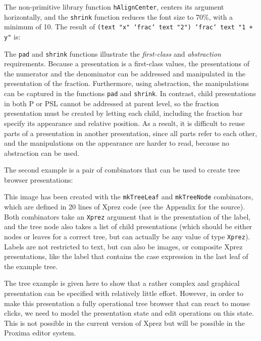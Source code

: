 \noindent The non-primitive library function \texttt{hAlignCenter}, centers its argument horizontally, and the \texttt{shrink} function reduces the font size to 70\%, with a minimum of 10. The result of \texttt{(text "x" `frac` text "2") `frac` text "1 + y"} is:

\begin{center}
\end{center}

The \texttt{pad} and \texttt{shrink} functions illustrate the {\em first-class} and {\em abstraction} requirements. Because a presentation is a first-class values, the presentations of the numerator and the denominator can be addressed and manipulated in the presentation of the fraction. Furthermore, using abstraction, the manipulations can be captured in the functions \texttt{pad} and \texttt{shrink}. In contrast, child presentations in both P or PSL cannot be addressed at parent level, so the fraction presentation must be created by letting each child, including the fraction bar specify its appearance and relative position. As a result, it is difficult to reuse parts of a presentation in another presentation, since all parts refer to each other, and the manipulations on the appearance are harder to read, because no abstraction can be used. 

The second example is a pair of combinators that can be used to create tree browser presentations:

\begin{center}
\end{center}

\noindent This image has been created with the \texttt{mkTreeLeaf} and \texttt{mkTreeNode} combinators, which are defined in 20 lines of {\sc Xprez} code (see the Appendix for the source). Both combinators take an \texttt{Xprez} argument that is the presentation of the label, and the tree node also takes a list of child presentations (which should be either nodes or leaves for a correct tree, but can actually be any value of type \texttt{Xprez}). Labels are not restricted to text, but can also be images, or composite {\sc Xprez} presentations, like the label that contains the case expression in the last leaf of the example tree. 

The tree example is given here to show that a rather complex and graphical presentation can be specified with relatively little effort. However, in order to make this presentation a fully operational tree browser that can react to mouse clicks, we need to model the presentation state and edit operations on this state. This is not possible in the current version of {\sc Xprez} but will be possible in the Proxima editor system.


